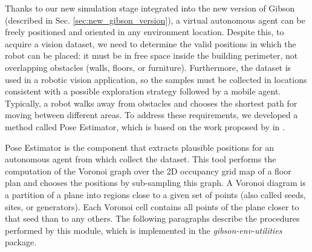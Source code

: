 Thanks to our new simulation stage integrated into the new version of Gibson (described in Sec. \ref{sec:new_gibson_version}), a virtual autonomous agent can be freely positioned and oriented in any environment location. Despite this, to acquire a vision dataset, we need to determine the valid positions in which the robot can be placed: it must be in free space inside the building perimeter, not overlapping obstacles (walls, floors, or furniture). Furthermore, the dataset is used in a robotic vision application, so the samples must be collected in locations consistent with a possible exploration strategy followed by a mobile agent. Typically, a robot walks away from obstacles and chooses the shortest path for moving between different areas. To address these requirements, we developed a method called Pose Estimator, which is based on the work proposed by \citeauthor{repeatabilityslamarxiv} in \cite{repeatabilityslamarxiv, repeatabilityslam}.

Pose Estimator is the component that extracts plausible positions for an autonomous agent from which collect the dataset. This tool performs the computation of the Voronoi graph over the 2D occupancy grid map \cite{cuupancygridfirst} of a floor plan and chooses the positions by sub-sampling this graph. A Voronoi diagram is a partition of a plane into regions close to a given set of points (also called seeds, sites, or generators). Each Voronoi cell contains all points of the plane closer to that seed than to any others. The following paragraphs describe the procedures performed by this module, which is implemented in the \textit{gibson-env-utilities} package.




